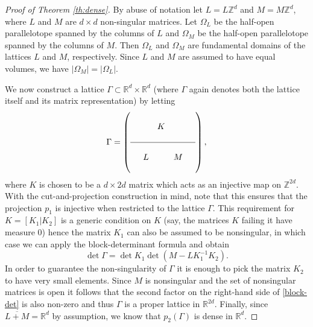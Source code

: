 \documentclass[10pt,a4paper]{amsart}
\newcommand{\RR}{{\mathbb R}}
\begin{document}
\begin{proof}[Proof of Theorem \ref{th:dense}]
By abuse of notation let $L=L\mathbb{Z}^d$ and $M=M\mathbb{Z}^d$, where $L$ and $M$ are $d\times d$ non-singular matrices. Let $\Omega_L$ be the half-open parallelotope spanned by the columns of $L$ and $\Omega_M$ be the half-open parallelotope spanned by the columns of $M$. Then $\Omega_L$ and $\Omega_M$ are fundamental domains of the lattices $L$ and $M$, respectively. Since $L$ and $M$ are assumed to have equal volumes, we have $|\Omega_M| = |\Omega_L|$.

We now construct a lattice $\Gamma \subset \mathbb{R}^d \times \mathbb{R}^d$ (where $\Gamma$ again denotes both the lattice itself and its matrix representation) by letting
\begin{equation*}
\Gamma = 
\left(
\begin{array}{c c c c c}
\\
& & K & & \\
\\
 \hline
 \\
& L &  & M & \\ 
 \\
\end{array}
\right),
\end{equation*}
where $K$ is chosen to be a $d \times 2d$ matrix which acts as an injective map on $\mathbb{Z}^{2d}$. With the cut-and-projection construction in mind, note that this ensures that the projection $p_1$ is injective when restricted to the lattice $\Gamma$. This requirement for $K = [K_1 | K_2]$ is a generic condition on $K$ (say, the matrices $K$ failing it have measure $0$) hence the matrix $K_1$ can also be assumed to be nonsingular, in which case we can apply the block-determinant formula and obtain
\begin{equation}\label{block-det}
\det\Gamma = \det K_1 \det(M-L K_1^{-1} K_2).
\end{equation}
In order to guarantee the non-singularity of $\Gamma$ it is enough to pick the matrix $K_2$ to have very small elements. Since $M$ is nonsingular and the set of nonsingular matrices is open it follows that the second factor on the right-hand side of  \eqref{block-det} is also non-zero and thus $\Gamma$ is a proper lattice in $\RR^{2d}$. Finally, since $\overline{L+M}=\mathbb{R}^d$ by assumption, we know that $p_2(\Gamma)$ is dense in $\mathbb{R}^d$.



\end{proof}
\end{document}
